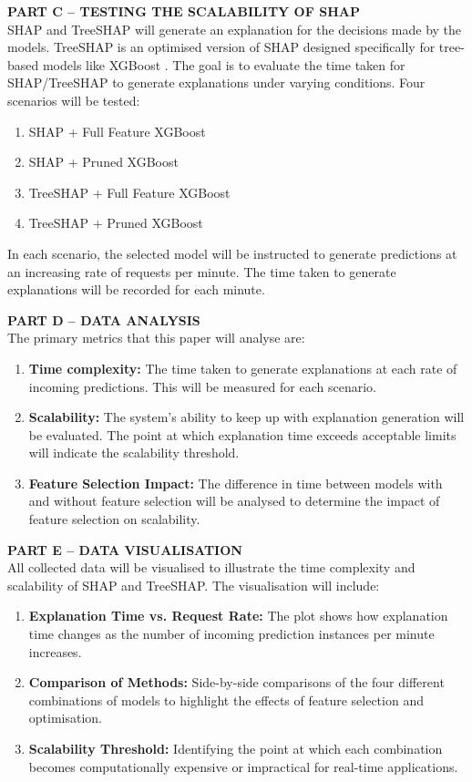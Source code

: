 \documentclass[12pt,a4paper]{article}
\begin{document}
\textbf{PART C – TESTING THE SCALABILITY OF SHAP}\\
SHAP and TreeSHAP will generate an explanation for the decisions made by the models. TreeSHAP is an optimised version of SHAP designed specifically for tree-based models like XGBoost \citep{muschalik2024beyond}. The goal is to evaluate the time taken for SHAP/TreeSHAP to generate explanations under varying conditions. Four scenarios will be tested:
\vspace{-1em}
\begin{enumerate}
    \item SHAP + Full Feature XGBoost
    \item SHAP + Pruned XGBoost
    \item TreeSHAP + Full Feature XGBoost
    \item TreeSHAP + Pruned XGBoost
\end{enumerate}
\vspace{-1em}
In each scenario, the selected model will be instructed to generate predictions at an increasing rate of requests per minute. The time taken to generate explanations will be recorded for each minute.

\textbf{PART D – DATA ANALYSIS}\\
The primary metrics that this paper will analyse are:
\vspace{-1em}
\begin{enumerate}
    \item \textbf{Time complexity:} The time taken to generate explanations at each rate of incoming predictions. This will be measured for each scenario.
    \item \textbf{Scalability:} The system’s ability to keep up with explanation generation will be evaluated. The point at which explanation time exceeds acceptable limits will indicate the scalability threshold.
    \item \textbf{Feature Selection Impact:} The difference in time between models with and without feature selection will be analysed to determine the impact of feature selection on scalability.
\end{enumerate}
	
\textbf{PART E – DATA VISUALISATION}\\
All collected data will be visualised to illustrate the time complexity and scalability of SHAP and TreeSHAP. The visualisation will include:
\vspace{-1em}
\begin{enumerate}
    \item \textbf{Explanation Time vs. Request Rate:} The plot shows how explanation time changes as the number of incoming prediction instances per minute increases.
    \item \textbf{Comparison of Methods:} Side-by-side comparisons of the four different combinations of models to highlight the effects of feature selection and optimisation.
    \item \textbf{Scalability Threshold:} Identifying the point at which each combination becomes computationally expensive or impractical for real-time applications.
\end{enumerate}
	
\end{document}
